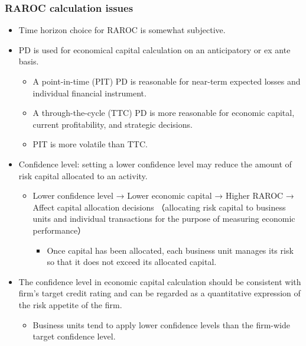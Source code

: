 \subsubsection{RAROC calculation issues}
\begin{itemize}
\item Time horizon choice for RAROC is somewhat subjective.
\item PD is used for economical capital calculation on an anticipatory or ex ante basis.
    \begin{itemize}
    \item A point-in-time (PIT) PD is reasonable for near-term expected losses and individual financial instrument.
    \item A through-the-cycle (TTC) PD is more reasonable for economic capital, current profitability, and strategic decisions.
    \item PIT is more volatile than TTC.
    \end{itemize}
\item Confidence level: setting a lower confidence level may reduce the amount of risk capital allocated to an activity.
    \begin{itemize}
    \item Lower confidence level → Lower economic capital →  Higher RAROC → Affect capital allocation decisions （allocating risk capital to business units and individual transactions for the purpose of measuring economic performance）
        \begin{itemize}
        \item Once capital has been allocated, each business unit manages its risk so that it does not exceed its allocated capital.
        \end{itemize}
    \end{itemize}
\item The confidence level in economic capital calculation should be consistent with firm's target credit rating and can be regarded as a quantitative expression of the risk appetite of the firm.
    \begin{itemize}
    \item Business units tend to apply lower confidence levels than the firm-wide target confidence level.
    \end{itemize}
\end{itemize}


